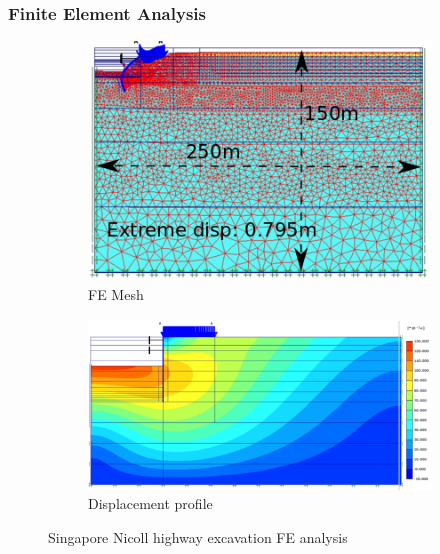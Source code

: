 \documentclass[handout]{beamer}
\begin{document}
\begin{frame}
\frametitle{Finite Element Analysis}
\begin{figure}[ht]
	\centering
	\begin{subfigure}[b]{0.4\linewidth}
		\centering
		\includegraphics[width=\textwidth]{figs/fea-geotech-mesh.png}
		\caption{FE Mesh}
	\end{subfigure}%
	\begin{subfigure}[b]{0.6\linewidth}
		\centering
		\includegraphics[width=\textwidth]{figs/fea-geotech.png}
		\caption{Displacement profile}
	\end{subfigure}
	\caption*{Singapore Nicoll highway excavation FE analysis}
\end{figure}
\end{frame}
\end{document}
